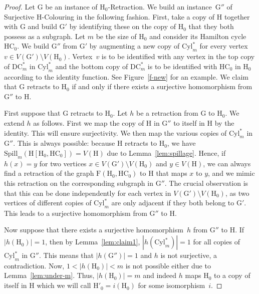 \documentclass[a4paper,12pt]{article}
\theoremstyle{remark}
\newcommand{\HC}[0]{\ensuremath{\mathrm{HC}}}
\newcommand{\DCm}[0]{\ensuremath{\mathrm{DC}^*_m}}
\newcommand{\Cylm}[0]{\ensuremath{\mathrm{Cyl}^*_m}}
\newcommand{\G}{\ensuremath{\mathrm{G}}}
\newcommand{\F}{\ensuremath{\mathrm{F}}}
\renewcommand{\H}{\ensuremath{\mathrm{H}}}
\begin{document}
\begin{proof}
Let $\G$ be an instance of $\H_0$-{\sc Retraction}.
We build an instance~$\G''$ of {\sc Surjective $\H$-Colouring}
in the following fashion. First, take a copy of $\H$ together with $\G$ and build $\G'$ by identifying these on the copy of $\H_0$ that they both possess as a subgraph.
Let $m$ be the size of $\H_0$ and consider its Hamilton cycle $\HC_0$. We build $\G''$ from $\G'$ by augmenting a new copy of $\Cylm$ for every vertex
$v \in V(\G') \setminus V(\H_0)$. 
Vertex~$v$ is to be identified with any vertex in the top copy of $\DCm$ in $\Cylm$ and the bottom copy of $\DCm$ is to be identified with $\HC_0$ in $\H_0$ according to the identity function.
See Figure~\ref{f-new} for an example.
We claim that $\G$ retracts to $\H_0$ if and only if there exists a surjective homomorphism from $\G''$  to $\H$.

First suppose that $\G$ retracts to $\H_0$.
Let $h$ be a retraction from $\G$ to $\H_0$. We extend $h$ as follows. First we map the copy of $\H$ in $\G''$ to itself in $\H$ by the identity. This will ensure surjectivity. We then map the various copies of $\Cylm$ in $\G''$. This is always possible: because $\H$ retracts to $\H_0$, we have $\mathrm{Spill}_m(\H[\H_0,\HC_0])=V(\H)$ due to Lemma~\ref{lem:spillage}. Hence, if $h(x)=y$ for two vertices $x\in V(\G')\setminus V(\H_0)$ and $y\in V(\H)$, we can always find a retraction of the graph $\F(\H_0,\HC_0)$ to $\H$ that maps $x$ to $y$, and we mimic this retraction on the corresponding subgraph in $\G''$. The crucial observation is that this can be done independently for each vertex in $V(\G')\setminus V(\H_0)$, as two vertices of different copies of $\Cylm$ are only adjacent if they both belong to $\G'$.
This leads to a surjective homomorphism from $\G''$ to $\H$.

Now suppose that there exists a surjective homomorphism~$h$ from $\G''$  to $\H$.
If $|h(\H_0)|=1$, then by Lemma~\ref{lem:claim1}, $|h(\Cylm)|=1$ for all copies of $\Cylm$ in $\G''$. This means that $|h(\G'')|=1$ and $h$ is not surjective, a contradiction. Now, $1<|h(\H_0)|<m$ is not possible either due to Lemma~\ref{lem:under-m}. Thus, $|h(\H_0)|=m$ and indeed $h$ maps $\H_0$ to a copy of itself in $\H$ which we will call $\H'_0=i(\H_0)$ for some isomorphism~$i$. 


\end{proof}
\end{document}
